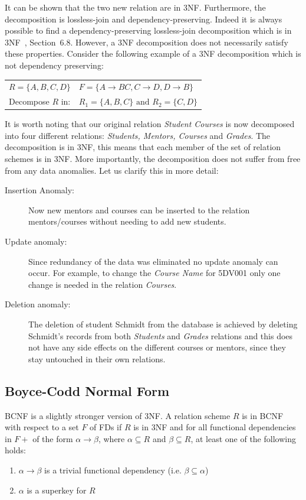 It can be shown that the two new relation are in 3NF. Furthermore, the 
decomposition is lossless-join and dependency-preserving. Indeed it is always 
possible to find a dependency-preserving lossless-join decomposition which is in 3NF~\cite{bdb2}, Section~6.8.
However, a 3NF decomposition does not necessarily satisfy these properties. Consider the following example
of a 3NF decomposition which is not dependency preserving:

\begin{center}
\begin{tabular}[h]{l l}
  $R = \{A, B, C, D\}$ & $F = \{A \rightarrow BC, C \rightarrow D, D \rightarrow B\}$ \\
  Decompose $R$ in:  & $R_1 = \{A, B, C\} \mbox{ and } R_2 = \{C,D\}$ \\ 
\end{tabular}
\end{center}

It is worth noting that our original relation \textit{Student Courses} is now decomposed
into four different relations: \textit{Students, Mentors, Courses} and \textit{Grades}. The 
decomposition is in 3NF, this means that each member of the set of relation schemes is in 3NF. 
More importantly, the decomposition does not suffer from free from any data anomalies. 
Let us clarify this in more detail:
\begin{description}
  \item[Insertion Anomaly:] Now new mentors and courses can be inserted to the relation mentors/courses without needing to add new students.
  \item[Update anomaly:] Since redundancy of the data was eliminated no update anomaly can occur. For example, to change the \textit{Course Name} for 5DV001 only one change is needed in the relation \textit{Courses}.
  \item[Deletion anomaly:]  The deletion of student Schmidt from the database is achieved by deleting Schmidt's records from both \textit{Students} and \textit{Grades} relations and this does not have any side effects on the different courses or mentors, since they stay untouched in their own relations.  
\end{description}

\subsection{Boyce-Codd Normal Form}
\label{sec:BCNF}
BCNF is a slightly stronger version of 3NF. A relation scheme $R$ is in BCNF 
with respect to a set $F$ of FDs if $R$ is in 3NF and for all functional dependencies in $F+$ 
of the form $\alpha \rightarrow \beta$, where $\alpha \subseteq R$ and $\beta \subseteq R$,
at least one of the following holds:
\begin{enumerate}
  \item $\alpha \rightarrow \beta$ is a trivial functional dependency (i.e. $\beta \subseteq \alpha$)
  \item $\alpha$ is a superkey for $R$ 
\end{enumerate}


